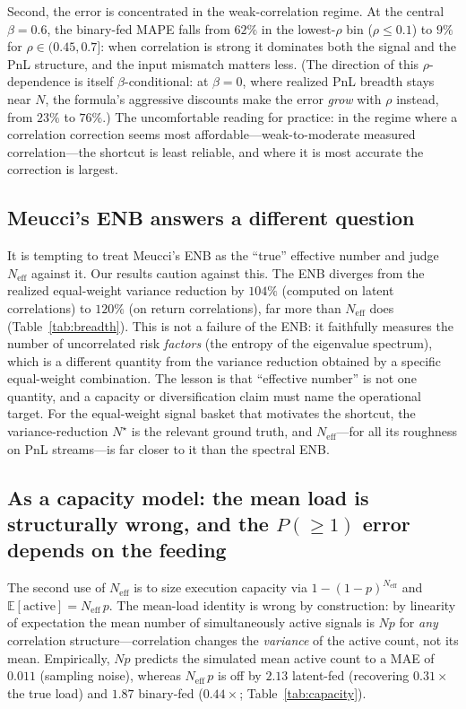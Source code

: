 \documentclass[11pt]{article}
\newcommand{\Neff}{N_{\mathrm{eff}}}
\begin{document}
Second, the error is concentrated in the weak-correlation regime. At the
central $\beta=0.6$, the binary-fed MAPE falls from $62\%$ in the lowest-$\rho$
bin ($\rho\le0.1$) to $9\%$ for $\rho\in(0.45,0.7]$: when correlation is strong
it dominates both the signal and the PnL structure, and the input mismatch
matters less. (The direction of this $\rho$-dependence is itself
$\beta$-conditional: at $\beta=0$, where realized PnL breadth stays near $N$,
the formula's aggressive discounts make the error \emph{grow} with $\rho$
instead, from $23\%$ to $76\%$.) The uncomfortable reading for practice: in the
regime where a correlation correction seems most affordable---weak-to-moderate
measured correlation---the shortcut is least reliable, and where it is most
accurate the correction is largest.

\subsection{Meucci's ENB answers a different question}
\label{sec:enb}

It is tempting to treat Meucci's ENB as the ``true'' effective number and judge
$\Neff$ against it. Our results caution against this. The ENB diverges from the
realized equal-weight variance reduction by $104\%$ (computed on latent
correlations) to $120\%$ (on return correlations), far more than $\Neff$ does
(Table~\ref{tab:breadth}). This is not a failure of the ENB: it faithfully measures
the number of uncorrelated risk \emph{factors} (the entropy of the eigenvalue
spectrum), which is a different quantity from the variance reduction obtained by a
specific equal-weight combination. The lesson is that ``effective number'' is not
one quantity, and a capacity or diversification claim must name the operational
target. For the equal-weight signal basket that motivates the shortcut, the
variance-reduction $N^{\star}$ is the relevant ground truth, and $\Neff$---for all
its roughness on PnL streams---is far closer to it than the spectral ENB.

\subsection{As a capacity model: the mean load is structurally wrong, and the
$P(\ge1)$ error depends on the feeding}
\label{sec:capacity}

The second use of $\Neff$ is to size execution capacity via
$1-(1-p)^{\Neff}$ and $\mathbb{E}[\text{active}]=\Neff\,p$. The mean-load
identity is wrong by construction: by linearity of expectation the mean number
of simultaneously active signals is $Np$ for \emph{any} correlation
structure---correlation changes the \emph{variance} of the active count, not its
mean. Empirically, $Np$ predicts the simulated mean active count to a MAE of
$0.011$ (sampling noise), whereas $\Neff\,p$ is off by $2.13$ latent-fed
(recovering $0.31\times$ the true load) and $1.87$ binary-fed ($0.44\times$;
Table~\ref{tab:capacity}).
\end{document}
